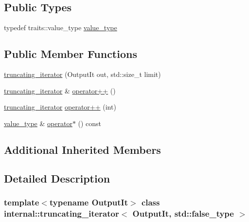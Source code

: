 \subsection*{Public Types}
\begin{DoxyCompactItemize}
\item 
typedef traits\+::value\+\_\+type \hyperlink{classinternal_1_1truncating__iterator_3_01_output_it_00_01std_1_1false__type_01_4_a2754973ff1a167f595594c80ff9faca2}{value\+\_\+type}
\end{DoxyCompactItemize}
\subsection*{Public Member Functions}
\begin{DoxyCompactItemize}
\item 
\hyperlink{classinternal_1_1truncating__iterator_3_01_output_it_00_01std_1_1false__type_01_4_a852c34238f920b986216b598eb054612}{truncating\+\_\+iterator} (Output\+It out, std\+::size\+\_\+t limit)
\item 
\hyperlink{classinternal_1_1truncating__iterator}{truncating\+\_\+iterator} \& \hyperlink{classinternal_1_1truncating__iterator_3_01_output_it_00_01std_1_1false__type_01_4_a35376bd0b2e8a1f9ee184008d4c10468}{operator++} ()
\item 
\hyperlink{classinternal_1_1truncating__iterator}{truncating\+\_\+iterator} \hyperlink{classinternal_1_1truncating__iterator_3_01_output_it_00_01std_1_1false__type_01_4_a9ba2299a0cd4c3938582d135ff3092a9}{operator++} (int)
\item 
\hyperlink{classinternal_1_1truncating__iterator_3_01_output_it_00_01std_1_1false__type_01_4_a2754973ff1a167f595594c80ff9faca2}{value\+\_\+type} \& \hyperlink{classinternal_1_1truncating__iterator_3_01_output_it_00_01std_1_1false__type_01_4_ab82a20d9b1cca826e7c84f3984f69adf}{operator$\ast$} () const
\end{DoxyCompactItemize}
\subsection*{Additional Inherited Members}


\subsection{Detailed Description}
\subsubsection*{template$<$typename Output\+It$>$\newline
class internal\+::truncating\+\_\+iterator$<$ Output\+It, std\+::false\+\_\+type $>$}



